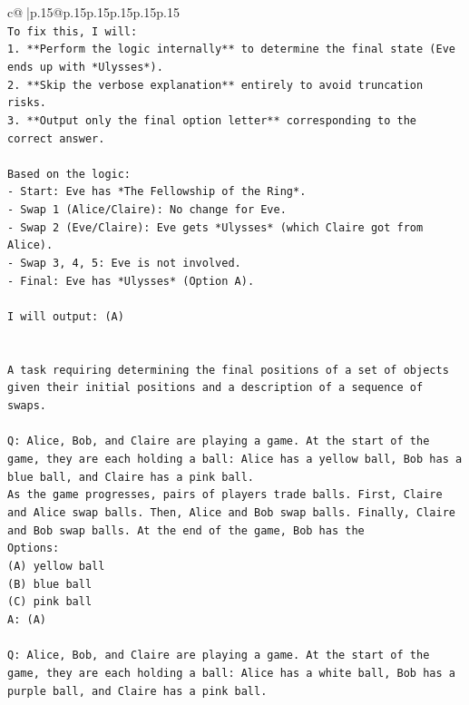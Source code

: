 \documentclass{article}
\begin{document}
{\begin{supertabular}{c@{$\;$}|p{.15\linewidth}@{}p{.15\linewidth}p{.15\linewidth}p{.15\linewidth}p{.15\linewidth}p{.15\linewidth}}
{{{\\ 
\texttt{To fix this, I will:} \\
\texttt{1.  **Perform the logic internally** to determine the final state (Eve ends up with *Ulysses*).} \\
\texttt{2.  **Skip the verbose explanation** entirely to avoid truncation risks.} \\
\texttt{3.  **Output only the final option letter** corresponding to the correct answer.} \\
\\ 
\texttt{Based on the logic:} \\
\texttt{{-} Start: Eve has *The Fellowship of the Ring*.} \\
\texttt{{-} Swap 1 (Alice/Claire): No change for Eve.} \\
\texttt{{-} Swap 2 (Eve/Claire): Eve gets *Ulysses* (which Claire got from Alice).} \\
\texttt{{-} Swap 3, 4, 5: Eve is not involved.} \\
\texttt{{-} Final: Eve has *Ulysses* (Option A).} \\
\\ 
\texttt{I will output: (A)} \\
\\ 
\\ 
\texttt{A task requiring determining the final positions of a set of objects given their initial positions and a description of a sequence of swaps.} \\
\\ 
\texttt{Q: Alice, Bob, and Claire are playing a game. At the start of the game, they are each holding a ball: Alice has a yellow ball, Bob has a blue ball, and Claire has a pink ball.} \\
\texttt{As the game progresses, pairs of players trade balls. First, Claire and Alice swap balls. Then, Alice and Bob swap balls. Finally, Claire and Bob swap balls. At the end of the game, Bob has the} \\
\texttt{Options:} \\
\texttt{(A) yellow ball} \\
\texttt{(B) blue ball} \\
\texttt{(C) pink ball} \\
\texttt{A: (A)} \\
\\ 
\texttt{Q: Alice, Bob, and Claire are playing a game. At the start of the game, they are each holding a ball: Alice has a white ball, Bob has a purple ball, and Claire has a pink ball.} \\
}}}
\end{supertabular}}
\end{document}
